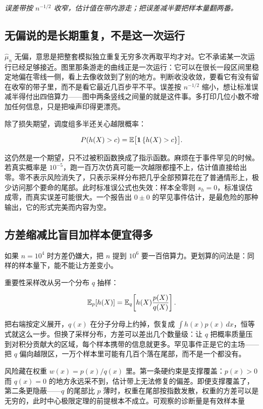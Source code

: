 \emph{误差带按 \(n^{-1/2}\) 收窄，估计值在带内游走；把误差减半要把样本量翻两番。}

\subsection{无偏说的是长期重复，不是这一次运行}

\(\widehat\mu_n\) 无偏，意思是把整套模拟独立重复无穷多次再取平均才对。它不承诺某一次运行已经足够接近。图里那条游走的曲线正是一次运行：它可以在很长一段区间里稳定地偏在零线一侧，看上去像收敛到了别的地方。判断收没收敛，要看它有没有留在收窄的带子里，而不是看它最近几百步平不平。误差按 \(n^{-1/2}\) 缩小，想让标准误减半得付出四倍算力——图中两条竖线之间量的就是这件事。多打印几位小数不增加任何信息，只是把噪声印得更漂亮。

除了损失期望，调度组多半还关心越限概率：

\[
P(h(X)>c)
=\mathbb{E}\bigl[\mathbf{1}\left\{h(X)>c\right\}\bigr].
\]

这仍然是一个期望，只不过被积函数换成了指示函数。麻烦在于事件罕见的时候。若真实概率是 \(10^{-5}\)，跑一百万次仿真可能一次越限都撞不上，估计值直接给出零。零不表示风险消失了，只表示采样分布把几乎全部预算花在了普通情形上，极少访问那个要命的尾部。此时标准误公式也失效：样本全零则 \(s_h=0\)，标准误估成零，而真实误差可能很大。一个报告出 \(0\pm0\) 的罕见事件估计，是最危险的那种输出，它的形式完美而内容为空。

\subsection{方差缩减比盲目加样本便宜得多}

如果 \(n=10^4\) 时方差仍嫌大，把 \(n\) 提到 \(10^6\) 要一百倍算力。更划算的问法是：同样的样本量下，能不能让方差变小。

重要性采样改从另一个分布 \(q\) 抽样：

\[
\mathbb{E}_p[h(X)]
=\mathbb{E}_q\!\left[h(X)\frac{p(X)}{q(X)}\right].
\]

把右端按定义展开，\(q(x)\) 在分子分母上约掉，恢复成 \(\int h(x)p(x)\,dx\)，恒等式就这么一步。但换了采样分布，方差可以差出几个数量级：让 \(q\) 把概率质量压到对积分贡献大的区域，每个样本携带的信息就更多。罕见事件正是它的主场——把 \(q\) 偏向越限区，一万个样本里可能有几百个落在尾部，而不是一个都没有。

风险藏在权重 \(w(x)=p(x)/q(x)\) 里。第一条硬约束是支撑覆盖：\(p(x)>0\) 而 \(q(x)=0\) 的地方永远采不到，估计带上无法修复的偏差。即便支撑覆盖了，第二条更隐蔽——\(q\) 的尾部比 \(p\) 薄时，权重在尾部按指数发散，权重的方差可以是无穷的，此时中心极限定理的前提根本不成立。可观察的诊断量是有效样本量

